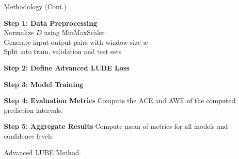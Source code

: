 \documentclass[xcolor=dvipsnames,aspectratio=169]{beamer}
\begin{document}
\begin{frame}{Methodology (Cont.)}
        \begin{algorithm}[H]
        \tiny
        \SetAlgoCaptionSeparator{:}
        
    
        \textbf{Step 1: Data Preprocessing}\\
        Normalize $D$ using MinMaxScaler\\
        Generate input-output pairs with window size $w$\\
        Split into train, validation and test sets
    
        \textbf{Step 2: Define Advanced LUBE Loss}\\
    
        \textbf{Step 3: Model Training}\\
    
        \textbf{Step 4: Evaluation Metrics}
        Compute the ACE and AWE of the computed prediction intervals.
    
        \textbf{Step 5: Aggregate Results}
        Compute mean of metrics for all models and confidence levels
        
        \caption{Advanced LUBE Method.}
        \end{algorithm}
\end{frame}
\end{document}
